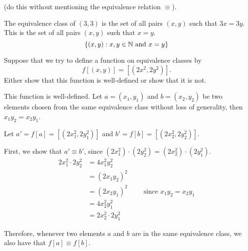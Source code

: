 \begin{problem}
\begin{enumalph}
      (do this without mentioning the equivalence relation $\equiv$).
      \begin{Answer}
        The equivalence class of $(3, 3)$ is the set of all pairs $(x, y)$
        such that $3x = 3y$.
        This is the set of all pairs $(x, y)$ such that $x = y$.
        \[ \left\{(x, y) : x, y \in \mathbb{N} \text{ and } x = y\right\}\]
      \end{Answer} 
    \item Suppose that we try to define a function on equivalence classes by
      \[ f[(x, y)] = [(2x^2, 2y^2)]. \]
      Either show that this function is well-defined or show that it is not.
      \begin{Answer}
        This function is well-defined.
        Let $a = (x_1, y_1)$ and $b = (x_2, y_2)$ be two elements chosen from the same
        equivalence class without loss of generality,
        then $x_1 y_2 = x_2 y_1$.

        \step
        Let $a' = f[a] = [(2x_1^2, 2y_1^2)]$ and $b' = f[b] = [(2x_2^2, 2y_2^2)]$.

        \step
        First, we show that $a' \equiv b'$, since $(2x_1^2) \cdot (2y_2^2) = (2x_2^2) \cdot (2y_1^2)$.
        \begin{align*}
          2x_1^2 \cdot 2y_2^2 &= 4x_1^2 y_2^2 \\
          &= (2x_1y_2)^2 \\
          &= (2x_2y_1)^2 \quad \quad \text{ since $x_1y_2 = x_2 y_1$}\\
          &= 4x_2^2 y_1^2 \\
          &= 2x_2^2 \cdot 2y_1^2
        \end{align*}

        \step
        Therefore, whenever two elements $a$ and $b$ are in the same equivalence class,
        we also have that $f[a] \equiv f[b]$.

      \end{Answer}
  \end{enumalph}
\end{problem}
